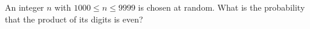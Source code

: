 An integer $n$ with $1000\le n\le9999$ is chosen at random. What is the probability that the product of its digits is even?
